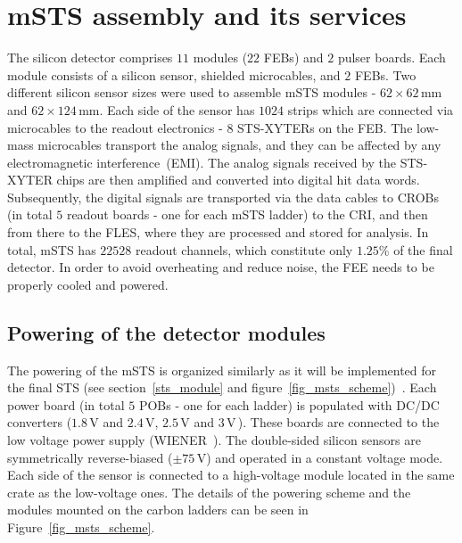 \section{mSTS assembly and its services}

 The silicon detector comprises $11$ modules ($22$ \glspl{FEB}) and $2$ pulser boards. Each module consists of a silicon sensor, shielded microcables, and $2$ \glspl{FEB}. Two different silicon sensor sizes were used to assemble \gls{mSTS} modules - $62\times62$\,mm and $62\times124$\,mm. Each side of the sensor has $1024$ strips which are connected via microcables to the readout electronics - $8$ STS-XYTERs on the \gls{FEB}. The low-mass microcables transport the analog signals, and they can be affected by any electromagnetic interference~(\gls{EMI}). The analog signals received by the STS-XYTER chips are then amplified and converted into digital hit data words. Subsequently, the digital signals are transported via the data cables to \glspl{CROB} (in total $5$ readout boards - one for each \gls{mSTS} ladder) to the \gls{CRI}, and then from there to the \gls{FLES}, where they are processed and stored for analysis. In total, \gls{mSTS} has $22 528$ readout channels, which constitute only $1.25$\% of the final detector. In order to avoid overheating and reduce noise, the \gls{FEE} needs to be properly cooled and powered.  
\subsection{Powering of the detector modules}
\label{module}
The powering of the \gls{mSTS} is organized similarly as it will be implemented for the final \gls{STS} (see section~\ref{sts_module} and figure~\ref{fig_msts_scheme})~\cite{Koczon:2020Jc}. Each power board (in total $5$ \glspl{POB} - one for each ladder) is populated with DC/DC converters ($1.8$\,V and $2.4$\,V, $2.5$\,V and $3$\,V\,\cite{DC_DC_converter}). These boards are connected to the low voltage power supply (WIENER~\cite{wiener}). The double-sided silicon sensors are symmetrically reverse-biased ($\pm 75$\,V) and operated in a constant voltage mode. Each side of the sensor is connected to a high-voltage module located in the same crate as the low-voltage ones. The details of the powering scheme and the modules mounted on the carbon ladders can be seen in Figure~\ref{fig_msts_scheme}.


